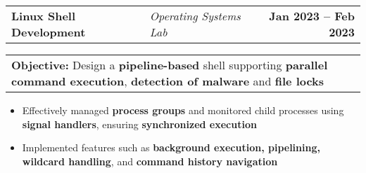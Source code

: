 \documentclass[letterpaper]{article}
\makeatletter
\newcommand{\resumeItem}[1]{
  \item\small{
    {#1 \vspace{-2pt}}
  }
}
\newcommand{\resumeProjectHeading}[4]{
    \item
    \begin{tabular*}{1.001\textwidth}{l @{\hspace{0.5em}} | @{\hspace{0.5em}} l @{\extracolsep{\fill}}r}
      \small#1 & \textit{\small #2} & \textbf{\small #3}\\
    \end{tabular*}
    \vspace{-12pt}
    \begin{tabular*}{1.1\textwidth}[t]{l}
      \textbf{\small Objective: }\small #4
    \end{tabular*}
    \vspace{-7pt}
}
\newcommand{\resumeItemListStart}{\begin{itemize}[leftmargin=0.2in]}
\newcommand{\resumeItemListEnd}{\end{itemize}\vspace{-5pt}}
\makeatother
\begin{document}
      \resumeProjectHeading
        {\textbf{Linux Shell Development}}{Operating Systems Lab}{Jan 2023 -- Feb 2023}
        {Design a \textbf{pipeline-based} shell supporting \textbf{parallel command execution}, \textbf{detection of malware} and \textbf{file locks}}
        \resumeItemListStart
          \resumeItem{Effectively managed \textbf{process groups} and monitored child processes using \textbf{signal handlers}, ensuring \textbf{synchronized execution}}
          \resumeItem{Implemented features such as \textbf{background execution, pipelining, wildcard handling}, and \textbf{command history navigation}}
        \resumeItemListEnd 



\end{document}
